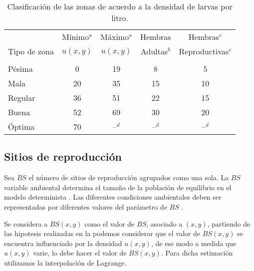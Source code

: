 \begin{table}
    \begin{minipage}{\textwidth}
\begin{center}
    \caption{\label{tab:cap4-puntaje-zona} Clasificación de las zonas de acuerdo a la densidad de larvas por litro.}
    \begin{tabular}{p{3cm} c c c c}
        \\
                     & Mínimo$^a$ & Máximo$^a$ & Hembras     & Hembras$^c$ \\
        Tipo de zona & $u(x,y)$   & $u(x,y)$   & Adultas$^b$ & Reproductivas$^c$ \\
        \hline
        \hline\\
        Pésima  & 0  & 19 & 8  & 5 \\
        Mala    & 20 & 35 & 15 & 10\\
        Regular & 36 & 51 & 22 & 15\\
        Buena   & 52 & 69 & 30 & 20\\
        Óptima  & 70 & --$^d$ & --$^d$ & --$^d$\\
    \end{tabular}
\end{center}
    \end{minipage}
\end{table}


\subsection{Sitios de reproducción}
\label{subsec:cap4-sitios de reproduccion}
Sea $BS$ el número de sitios de reproducción agrupados como una sola. La $BS$ variable ambiental
determina el tamaño de la población de equilibrio en el modelo determinista
\citep{otero2006stochastic}. Las diferentes condiciones ambientales deben ser
representadas por diferentes valores del parámetro de $BS$ \citet{otero2006stochastic}.

Se considera a $BS(x,y)$ como el valor de $BS$, asociado a $(x,y)$, partiendo de las hipotesis
realizadas en la  podemos considerar que el valor de $BS(x,y)$ se
encuentra influenciado por la densidad $u(x,y)$, de ese modo a medida que $u(x,y)$ varie, lo debe
hacer el valor de $BS(x,y)$. Para dicha estimación utilizamos la interpolación de Lagrange.

